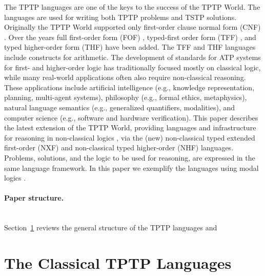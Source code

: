 \documentclass[runningheads]{llncs}
\begin{document}
The TPTP languages \cite{Sut22-IGPL} are one of the keys to the success of the TPTP World.
The languages are used for writing both TPTP problems and TSTP solutions.
Originally the TPTP World supported only first-order clause normal form (CNF) \cite{SS98-JAR}.
Over the years full first-order form (FOF) \cite{Sut09}, typed-first order form (TFF) 
\cite{SS+12,BP13-TFF1}, and typed higher-order form (THF) \cite{SB10,KSR16} have been added.
The TFF and THF languages include constructs for arithmetic.
The development of standards for ATP systems for first- and higher-order logic has traditionally 
focused mostly on classical logic, while many real-world applications often also require 
non-classical reasoning. 
These applications include artificial intelligence (e.g., knowledge representation, planning, 
multi-agent systems), philosophy (e.g., formal ethics, metaphysics), natural language semantics 
(e.g., generalized quantifiers, modalities), and computer science (e.g., software and hardware 
verification).
This paper describes the latest extension of the TPTP World, providing languages and
infrastructure for reasoning in non-classical logics \cite{Pri08,Gob01}, via the (new)
non-classical typed extended first-order (NXF) and non-classical typed higher-order (NHF) 
languages.
Problems, solutions, and the logic to be used for reasoning, are expressed in the same language 
framework.
In this paper we exemplify the languages using modal logics \cite{BBW06}.

\paragraph{Paper structure.}~\\
Section~\ref{TPTPLanguages} reviews the general structure of the TPTP languages and

\section{The Classical TPTP Languages}
\label{TPTPLanguages}
\end{document}
